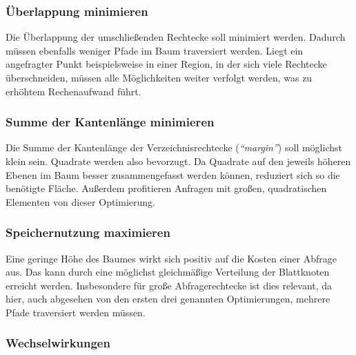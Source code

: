 \documentclass[runningheads,a4paper]{llncs}
\begin{document}
	\subsubsection{Überlappung minimieren} %
	\label{ssub:ueberlappung_minimieren}

	Die Überlappung der umschließenden Rechtecke soll minimiert werden. Dadurch müssen ebenfalls weniger Pfade im Baum traversiert werden. Liegt ein angefragter Punkt beispielsweise in einer Region, in der sich viele Rechtecke überschneiden, müssen alle Möglichkeiten weiter verfolgt werden, was zu erhöhtem Rechenaufwand führt.
	

	\subsubsection{Summe der Kantenlänge minimieren} %
	\label{ssub:kantenlaenge}

	Die Summe der Kantenlänge der Verzeichnisrechtecke (\emph{\enquote{margin}}) soll möglichst klein sein. Quadrate werden also bevorzugt. Da Quadrate auf den jeweils höheren Ebenen im Baum besser zusammengefasst werden können, reduziert sich so die benötigte Fläche.
	Außerdem profitieren Anfragen mit großen, quadratischen Elementen von dieser Optimierung. \citep[vgl.][323]{Beckmann:1990}
	

	\subsubsection{Speichernutzung maximieren} %
	\label{ssub:speichernutzung_maximieren}

	Eine geringe Höhe des Baumes wirkt sich positiv auf die Kosten einer Abfrage aus. Das kann durch eine möglichst gleichmäßige Verteilung der Blattknoten erreicht werden. Insbesondere für große Abfragerechtecke ist dies relevant, da hier, auch abgesehen von den ersten drei genannten Optimierungen, mehrere Pfade traversiert werden müssen. \citep[vgl.][323-324]{Beckmann:1990}
	

	\subsubsection{Wechselwirkungen} %
	\label{ssub:wechselwirkungen}
\end{document}
